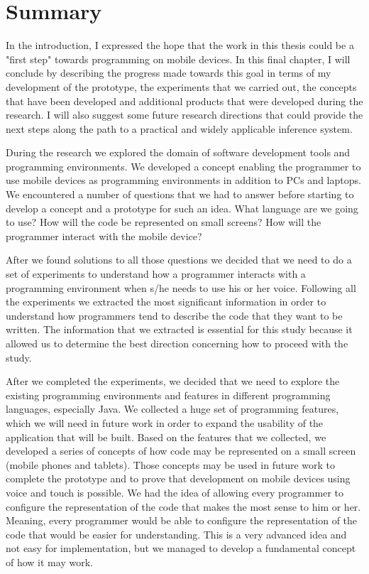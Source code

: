 \chapter{Summary}
In the introduction, I expressed the hope that the work in this thesis could be a "first step" towards programming on mobile devices. In this final chapter, I will conclude by describing the progress made towards this goal in terms of my development of the prototype, the experiments that we carried out, the concepts that have been developed and additional products that were developed during the research. I will also suggest some future research directions that could provide the next steps along the path to a practical and widely applicable inference system.

During the research we explored the domain of software development tools and programming environments. We developed a concept enabling the programmer to use mobile devices as programming environments in addition to PCs and laptops. We encountered a number of questions that we had to answer before starting to develop a concept and a prototype for such an idea. What language are we going to use? How will the code be represented on small screens?  How will the programmer interact with the mobile device?

After we found solutions to all those questions we decided that we need to do a set of experiments to understand how a programmer interacts with a programming environment when s/he needs to use his or her voice. Following all the experiments we extracted the most significant information in order to understand how programmers tend to describe the code that they want to be written. The information that we extracted is essential for this study because it allowed us to determine the best direction concerning how to proceed with the study.

After we completed the experiments, we decided that we need to explore the existing programming environments and features in different programming languages, especially Java. We collected a huge set of programming features, which we will need in future work in order to expand the usability of the application that will be built.
Based on the features that we collected, we developed a series of concepts of how code may be represented on a small screen (mobile phones and tablets). Those concepts may be used in future work to complete the prototype and to prove that development on mobile devices using voice and touch is possible.
We had the idea of allowing every programmer to configure the representation of the code that makes the most sense to him or her. Meaning, every programmer would be able to configure the representation of the code that would be easier for understanding. This is a very advanced idea and not easy for implementation, but we managed to develop a fundamental concept of how it may work.

